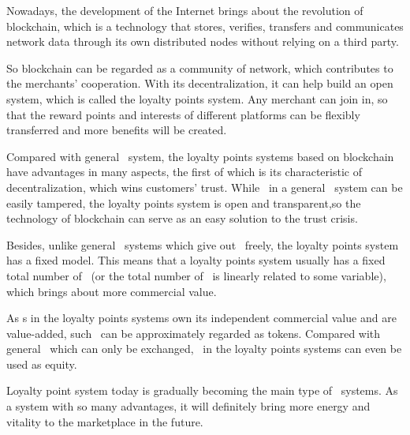 Nowadays, the development of the Internet brings about the revolution of blockchain, which is a technology that stores, verifies, transfers and communicates network data through its own distributed nodes without relying on a third party.

So blockchain can be regarded as a community of network, which contributes to the merchants’ cooperation. With its decentralization, it can help build an open system, which is called the loyalty points system. Any merchant can join in, so that the reward points and interests of different platforms can be flexibly transferred and more benefits will be created.

Compared with general \RPd\ system, the loyalty points systems based on blockchain have advantages in many aspects, the first of which is its characteristic of decentralization, which wins customers' trust. While \RPd\ in a general \RPd\ system can be easily tampered, the loyalty points system is open and transparent,so the technology of blockchain can serve as an easy solution to the trust crisis.

Besides, unlike general \RPd\ systems which give out \RPd\ freely, the loyalty points system has a fixed model. This means that a loyalty points system usually has a fixed total number of \RPd\ (or the total number of \RPd\ is linearly related to some variable), which brings about more commercial value.

As \RPd s in the loyalty points systems own its independent commercial value and are value-added, such \RPd\ can be approximately regarded as tokens. Compared with general \RPd\ which can only be exchanged, \RPd\ in the loyalty points systems can even be used as equity.

Loyalty point system today is gradually becoming the main type of \RPd\ systems. As a system with so many advantages, it will definitely bring more energy and vitality to the marketplace in the future.